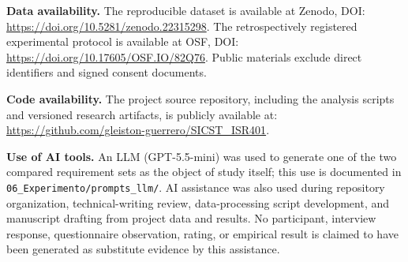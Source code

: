 \documentclass[pdflatex,sn-basic]{sn-jnl}
\begin{document}
\textbf{Data availability.}
The reproducible dataset is available at Zenodo, DOI:
\url{https://doi.org/10.5281/zenodo.22315298}.
The retrospectively registered experimental protocol is available at OSF, DOI:
\url{https://doi.org/10.17605/OSF.IO/82Q76}.
Public materials exclude direct identifiers and signed consent documents.

\textbf{Code availability.}
The project source repository, including the analysis scripts and versioned research artifacts, is publicly available at:
\url{https://github.com/gleiston-guerrero/SICST_ISR401}.

\textbf{Use of AI tools.}
An LLM (GPT-5.5-mini) was used to generate one of the two compared requirement sets as the object of study itself; this use is documented in \texttt{06\_Experimento/prompts\_llm/}. AI assistance was also used during repository organization, technical-writing review, data-processing script development, and manuscript drafting from project data and results. No participant, interview response, questionnaire observation, rating, or empirical result is claimed to have been generated as substitute evidence by this assistance.


\end{document}
